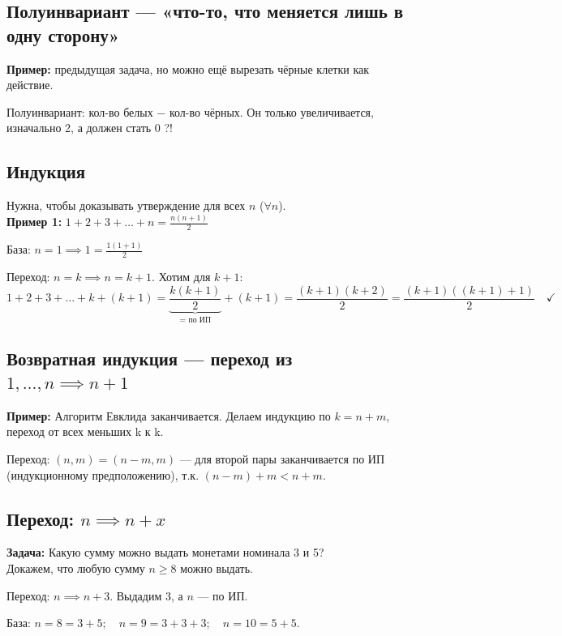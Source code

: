 \documentclass[10pt, a4paper]{article}
\begin{document}
\subsection*{Полуинвариант --- «что-то, что меняется лишь в одну сторону»}

\textbf{Пример:} предыдущая задача, но можно ещё вырезать чёрные клетки как действие.

\noindent Полуинвариант: кол-во белых $-\,\, \text{кол-во}$ чёрных. Он только увеличивается, изначально 2, а должен стать 0 ?!

\subsection*{Индукция}

Нужна, чтобы доказывать утверждение для всех $n$ ($\forall n$).\\

\noindent \textbf{Пример 1:} $1 + 2 + 3 + \dots + n = \frac{n(n+1)}{2}$

\noindent База: $n = 1 \implies 1 = \frac{1(1+1)}{2}$

\noindent Переход: $n = k \implies n = k+1$. Хотим для $k+1$:
\[ 1 + 2 + 3 + \dots + k + (k+1) = \underbrace{\frac{k(k+1)}{2}}_{\text{= по ИП}} + (k+1) = \frac{(k+1)(k+2)}{2} = \frac{(k+1)((k+1)+1)}{2} \quad \checkmark \]

\subsection*{Возвратная индукция --- переход из $1, \dots, n \implies n+1$}

\textbf{Пример:} Алгоритм Евклида заканчивается. Делаем индукцию по $k = n + m$, переход от всех меньших k к k.

\noindent Переход: $(n, m) = (n - m, m)$ --- для второй пары заканчивается по ИП (индукционному предположению), т.к. $(n - m) + m < n + m$.

\subsection*{Переход: $n \implies n+x$}

\textbf{Задача:} Какую сумму можно выдать монетами номинала 3 и 5? \\
Докажем, что любую сумму $n \ge 8$ можно выдать.

\noindent Переход: $n \implies n+3$. Выдадим 3, а $n$ --- по ИП.

\noindent База: 
$n = 8 = 3 + 5; \quad n = 9 = 3 + 3 + 3; \quad n = 10 = 5 + 5$.
\end{document}
